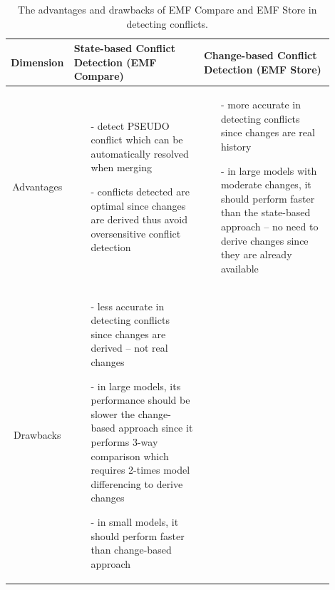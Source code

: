 \begin{table}[]
\centering
\caption{The advantages and drawbacks of EMF Compare and EMF Store in detecting conflicts.}
\label{tab:accuracy_emfcompare_emfstore}
\begin{tabular}{|p{0.1\linewidth}|p{0.4\linewidth}|p{0.4\linewidth}|}
	\hline
	\textbf{Dimension}
	& \textbf{State-based Conflict Detection (EMF Compare)}
	& \textbf{Change-based Conflict Detection (EMF Store)}\\
	\hline
	\multicolumn{1}{|c|}{Advantages}
	&
	\begin{minipage}[t]{\linewidth}
		\raggedright
		\begin{itemize}[leftmargin=9pt]
			\setlength\itemsep{2pt}
			\item[-] detect \textsf{PSEUDO} conflict which can be automatically resolved when merging
			\item[-] conflicts detected are optimal since changes are derived thus avoid oversensitive conflict detection
			\item[]
		\end{itemize}
	\end{minipage}
	&
	\begin{minipage}[t]{\linewidth}
		\raggedright
		\begin{itemize}[leftmargin=9pt]
			\setlength\itemsep{2pt}
			\item[-] more accurate in detecting conflicts since changes are real history
			\item[-] in large models with moderate changes, it should perform faster than the state-based approach -- no need to derive changes since they are already available 
			\item[]
		\end{itemize} 
	\end{minipage}
	\\ 
	\hline
	\multicolumn{1}{|c|}{Drawbacks}
	&
	\begin{minipage}[t]{\linewidth}
		\raggedright
		\begin{itemize}[leftmargin=9pt]
			\setlength\itemsep{2pt}
			\item[-] less accurate in detecting conflicts since changes are derived -- not real changes
			\item[-] in large models, its performance should be slower the change-based approach since it performs 3-way comparison which requires 2-times model differencing to derive changes
			\item[-] in small models, it should perform faster than change-based approach

\end{itemize}
\end{minipage}
\end{tabular}
\end{table}
